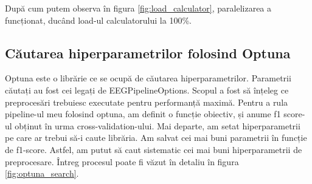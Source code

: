 După cum putem observa în figura \ref{fig:load_calculator}, paralelizarea a funcționat, ducând load-ul calculatorului la 100\%.

\subsection{Căutarea hiperparametrilor folosind Optuna}
Optuna\cite{optuna_2019} este o librărie ce se ocupă de căutarea hiperparametrilor. Parametrii căutați au fost cei legați de EEGPipelineOptions. Scopul a fost să înțeleg ce preprocesări trebuiesc executate pentru performanță maximă. Pentru a rula pipeline-ul meu folosind optuna, am definit o funcție obiectiv, și anume f1 score-ul obținut în urma cross-validation-ului. Mai departe, am setat hiperparametrii pe care ar trebui să-i caute librăria. Am salvat cei mai buni parametrii în funcție de f1-score. Astfel, am putut să caut sistematic cei mai buni hiperparametrii de preprocesare. Întreg procesul poate fi văzut în detaliu în figura \ref{fig:optuna_search}.
